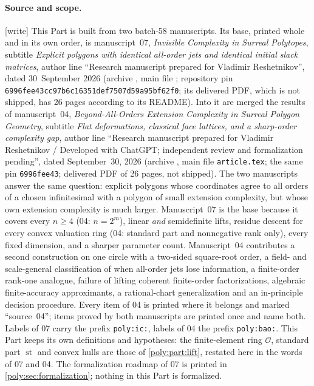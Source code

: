 \documentclass[11pt,a4paper]{article}
\numberwithin{equation}{section}
\theoremstyle{plain}
\newcommand{\wtag}{\textup{[write]}}%
\newcommand{\st}{\operatorname{st}}
\newcommand{\OO}{\mathcal O}
\begin{document}
\paragraph{Source and scope.}
\wtag{} This Part is built from two batch-58 manuscripts. Its base, printed
whole and in its own order, is manuscript~07, \emph{Invisible Complexity in
Surreal Polytopes}, subtitle \emph{Explicit polygons with identical all-order
jets and identical initial slack matrices}, author line ``Research manuscript
prepared for Vladimir Reshetnikov'', dated 30~September 2026 (archive
, main file ;
repository pin \texttt{6996fee43cc97b6c16351def7507d59a95bf62f0}; its
delivered PDF, which is not shipped, has 26 pages according to its README).
Into it are merged the results of manuscript~04, \emph{Beyond-All-Orders
Extension Complexity in Surreal Polygon Geometry}, subtitle \emph{Flat
deformations, classical face lattices, and a sharp-order complexity gap},
author line ``Research manuscript prepared for Vladimir Reshetnikov /
Developed with ChatGPT; independent review and formalization pending'', dated
September~30, 2026 (archive ,
main file \texttt{article.tex}; the same pin \texttt{6996fee43}; delivered PDF
of 26 pages, not shipped). The two manuscripts answer the same question:
explicit polygons whose coordinates agree to all orders of a chosen
infinitesimal with a polygon of small extension complexity, but whose own
extension complexity is much larger. Manuscript~07 is the base because it
covers every $n\geq4$ (04: $n=2^m$), linear \emph{and} semidefinite lifts,
residue descent for every convex valuation ring (04: standard part and
nonnegative rank only), every fixed dimension, and a sharper parameter count.
Manuscript~04 contributes a second construction on one circle with a
two-sided square-root order, a field- and scale-general classification of
when all-order jets lose information, a finite-order rank-one analogue,
failure of lifting coherent finite-order factorizations, algebraic
finite-accuracy approximants, a rational-chart generalization and an
in-principle decision procedure. Every item of 04 is printed where it
belongs and marked ``source~04''; items proved by both manuscripts are
printed once and name both. Labels of 07 carry the prefix
\texttt{poly:ic:}, labels of 04 the prefix \texttt{poly:bao:}. This Part
keeps its own definitions and hypotheses: the finite-element ring $\OO$,
standard part $\st$ and convex hulls are those of \cref{poly:part:lift}, restated here in the words of 07 and 04. The
formalization roadmap of 07 is printed in \cref{poly:sec:formalization};
nothing in this Part is formalized.
\end{document}
